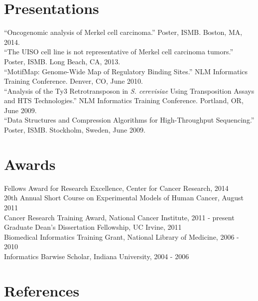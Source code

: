 \documentclass[margin,line]{res}
\begin{document}
\begin{resume}
\section{\sc Presentations}
``Oncogenomic analysis of Merkel cell carcinoma.'' Poster, ISMB. Boston, MA, 2014.\\
``The UISO cell line is not representative of Merkel cell carcinoma tumors.'' Poster, ISMB. Long Beach, CA, 2013.\\
``MotifMap: Genome-Wide Map of Regulatory Binding Sites.'' NLM Informatics Training Conference. Denver, CO, June 2010.\\
``Analysis of the Ty3 Retrotransposon in \textit{S. cerevisiae} Using Transposition Assays and HTS Technologies.'' NLM Informatics Training Conference. Portland, OR, June 2009.\\
``Data Structures and Compression Algorithms for High-Throughput Sequencing.'' Poster, ISMB. Stockholm, Sweden, June 2009.

\section{\sc Awards}
Fellows Award for Research Excellence, Center for Cancer Research, 2014\\
20th Annual Short Course on Experimental Models of Human Cancer, August 2011\\
Cancer Research Training Award, National Cancer Institute, 2011 - present\\
Graduate Dean’s Dissertation Fellowship, UC Irvine, 2011\\
Biomedical Informatics Training Grant, National Library of Medicine, 2006 - 2010\\
Informatics Barwise Scholar, Indiana University, 2004 - 2006


\section{\sc References} 


\end{resume}
\end{document}
